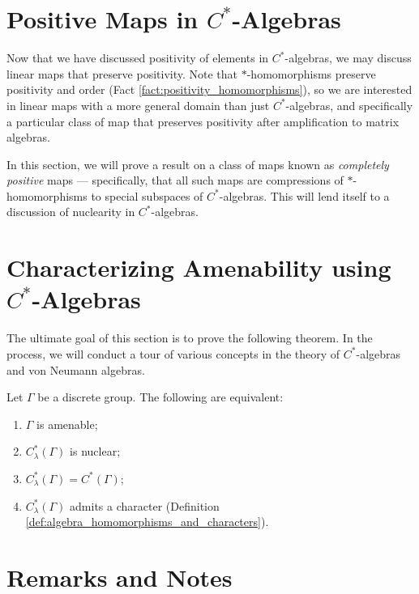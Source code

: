 \section{Positive Maps in \texorpdfstring{$C^{\ast}$-Algebras}{C*-Algebras}}%
Now that we have discussed positivity of elements in $C^{\ast}$-algebras, we may discuss linear maps that preserve positivity. Note that $\ast$-homomorphisms preserve positivity and order (Fact \ref{fact:positivity_homomorphisms}), so we are interested in linear maps with a more general domain than just $C^{\ast}$-algebras, and specifically a particular class of map that preserves positivity after amplification to matrix algebras.\newline

In this section, we will prove a result on a class of maps known as \textit{completely positive} maps --- specifically, that all such maps are compressions of $\ast$-homomorphisms to special subspaces of $C^{\ast}$-algebras. This will lend itself to a discussion of nuclearity in $C^{\ast}$-algebras.
\section{Characterizing Amenability using \texorpdfstring{$C^{\ast}$-Algebras}{C*-Algebras}}%
The ultimate goal of this section is to prove the following theorem. In the process, we will conduct a tour of various concepts in the theory of $C^{\ast}$-algebras and von Neumann algebras.
\begin{theorem}
  Let $\Gamma$ be a discrete group. The following are equivalent:
  \begin{enumerate}[(1)]
    \item $\Gamma$ is amenable;
    \item $C^{\ast}_{\lambda}\left( \Gamma \right)$ is nuclear;
    \item $C^{\ast}_{\lambda}\left( \Gamma \right) = C^{\ast}\left( \Gamma \right)$;
    \item $C^{\ast}_{\lambda}\left( \Gamma \right)$ admits a character (Definition \ref{def:algebra_homomorphisms_and_characters}).
  \end{enumerate}
\end{theorem}
\section{Remarks and Notes}%

